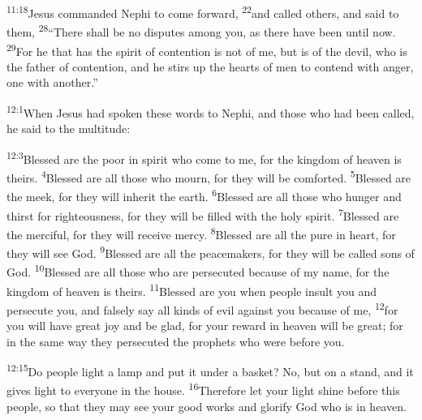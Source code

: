 \documentclass[openany,12pt,english]{book}
\newenvironment{para}{\par\pretolerance=100\tolerance=200\setlength{\emergencystretch}{0.6em}\relax}{\par}
\begin{document}
\begin{para}
    \textsuperscript{11:18}\thinspace{}Jesus commanded Nephi to come for\-ward,
    \textsuperscript{22}\thinspace{}and called others, and said to them,
    \textsuperscript{28}\thinspace{}“There shall be no disputes a\-mong you, as there have been un\-til now.
    \textsuperscript{29}\thinspace{}For he that has the spir\-it of con\-ten\-tion is not of me, but is of the dev\-il, who is the fa\-ther of con\-ten\-tion, and he stirs up the hearts of men to con\-tend with an\-ger, one with an\-oth\-er.”
\end{para}

\bigskip{}

\begin{para}
    \textsuperscript{12:1}\thinspace{}When Jesus had spo\-ken these words to Nephi, and those who had been called, he said to the mul\-ti\-tude:
\end{para}

\begin{para}
    \textsuperscript{12:3}\thinspace{}Bless\-ed are the poor in spir\-it who come to me, for the king\-dom of heav\-en is theirs.
    \textsuperscript{4}\thinspace{}Bless\-ed are all those who mourn, for they will be comforted.
    \textsuperscript{5}\thinspace{}Bless\-ed are the meek, for they will in\-her\-it the earth.
    \textsuperscript{6}\thinspace{}Bless\-ed are all those who hun\-ger and thirst for right\-eous\-ness, for they will be filled with the ho\-ly spir\-it.
    \textsuperscript{7}\thinspace{}Bless\-ed are the mer\-ci\-ful, for they will re\-ceive mer\-cy.
    \textsuperscript{8}\thinspace{}Bless\-ed are all the pure in heart, for they will see God.
    \textsuperscript{9}\thinspace{}Bless\-ed are all the peacemakers, for they will be called sons of God.
    \textsuperscript{10}\thinspace{}Bless\-ed are all those who are per\-se\-cut\-ed be\-cause of my name, for the king\-dom of heav\-en is theirs.
    \textsuperscript{11}\thinspace{}Bless\-ed are you when peo\-ple in\-sult you and per\-se\-cute you, and false\-ly say all kinds of evil a\-gainst you be\-cause of me,
    \textsuperscript{12}\thinspace{}for you will have great joy and be glad, for your re\-ward in heav\-en will be great; for in the same way they per\-se\-cut\-ed the prophets who were be\-fore you.
\end{para}

\begin{para}
    \textsuperscript{12:15}\thinspace{}Do peo\-ple light a lamp and put it un\-der a bas\-ket? No, but on a stand, and it gives light to eve\-ry\-one in the house.
    \textsuperscript{16}\thinspace{}There\-fore let your light shine be\-fore this peo\-ple, so that they may see your good works and glo\-ri\-fy God who is in heav\-en.
\end{para}
\end{document}
